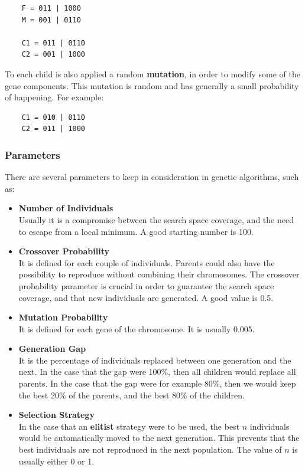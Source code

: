 \documentclass{article}
\begin{document}
\begin{verbatim}
    F = 011 | 1000
    M = 001 | 0110
	
    C1 = 011 | 0110
    C2 = 001 | 1000
\end{verbatim}
To each child is also applied a random \textbf{mutation}, in order to modify some of the gene components. This mutation is random and has generally a small probability of happening. For example:

\begin{verbatim}
    C1 = 010 | 0110
    C2 = 011 | 1000
\end{verbatim}

\subsubsection{Parameters}
There are several parameters to keep in consideration in genetic algorithms, such as:

\begin{itemize}
	\item \textbf{Number of Individuals}
	\vspace{.2cm} \\
	Usually it is a compromise between the search space coverage, and the need to escape from a local minimum. A good starting number is 100.
	
	\item \textbf{Crossover Probability}
	\vspace{.2cm} \\
	It is defined for each couple of individuals. Parents could also have the possibility to reproduce without combining their chromosomes. The crossover probability parameter is crucial in order to guarantee the search space coverage, and that new individuals are generated. A good value is 0.5.
	
	\item \textbf{Mutation Probability}
	\vspace{.2cm} \\
	It is defined for each gene of the chromosome. It is usually 0.005.
	
	\item \textbf{Generation Gap}
	\vspace{.2cm} \\It is the percentage of individuals replaced between one generation and the next. In the case that the gap were 100\%, then all children would replace all parents. In the case that the gap were for example 80\%, then we would keep the best 20\% of the parents, and the best 80\% of the children.
	
	\item \textbf{Selection Strategy}
	\vspace{.2cm} \\
	In the case that an \textbf{elitist} strategy were to be used, the best $n$ individuals would be automatically moved to the next generation. This prevents that the best individuals are not reproduced in the next population. The value of $n$ is usually either 0 or 1.
\end{itemize}
\end{document}
